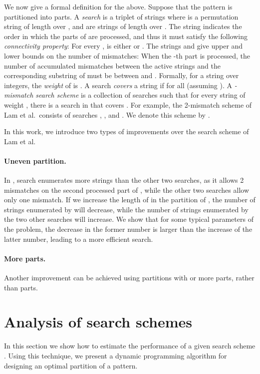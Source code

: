 \documentclass[12pt]{article}
\newif\iffull
\begin{document}
We now give a formal definition for the above.
Suppose that the pattern  is partitioned into  parts.
A \emph{search} is a triplet of strings 
where  is a permutation string of length  over ,
and  are strings of length  over .
The string  indicates the order in which the parts of  are processed,
and thus it must satisfy the following \emph{connectivity property}:
For every ,
 is either  or .
The strings  and  give upper and lower bounds on the number of
mismatches:
When the -th part is processed, the number of accumulated mismatches
between the active strings and the corresponding substring of  must be between
 and .
Formally, for a string  over integers,
the \emph{weight} of  is .
A search  \emph{covers} a string  if
 for all 
(assuming ).
A \emph{-mismatch search scheme}  is a collection of
searches such that for every string  of weight ,
there is a search in  that covers .
For example, the 2-mismatch scheme of Lam et al.\ consists of
searches , ,
and . We denote this scheme by .

In this work, we introduce two types of improvements over the search scheme of Lam et al.
\paragraph{Uneven partition.}
In , search  enumerates more strings
than the other two searches, as it allows 2 mismatches on the second
processed part
of , while the other two searches allow only one mismatch.
If we increase the length of  in the partition of , the
number of strings enumerated by  will decrease, while
the number of strings enumerated by the two other searches will increase.
We show that for some typical parameters of the problem, the decrease in the
former number is larger than the increase of the latter number,
leading to a more efficient search. 

\paragraph{More parts.}
Another improvement can be achieved using partitions with  or
more parts, rather than  parts.
\iffull
We explain in Section~\ref{sec:uneven} why such partitions can
reduce the number of enumerated strings.
\fi

\section{Analysis of search schemes}\label{sec:analysis}
In this section we show how to estimate the performance of a given search scheme
. Using this technique, we \iffull first explain why an
uneven partition can lead to a better performance, and then \fi present a
dynamic programming algorithm for designing an
optimal partition of a pattern. 
\end{document}

